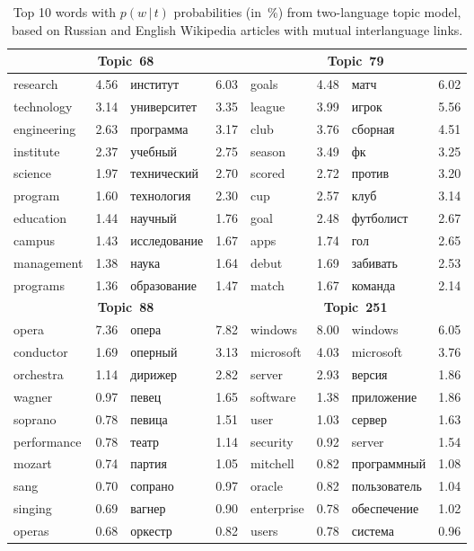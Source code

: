 \documentclass[russian]{llncs}
\newcommand{\cond}{\mspace{3mu}{|}\mspace{3mu}}
\begin{document}
\begin{table}[t!]
	\caption{
        Top 10 words with $p(w\cond t)$ probabilities (in~\%) from two-language topic model,
        based on Russian and English Wikipedia articles with mutual interlanguage links.}
	\label{tab:top10words}
	\centering\tabcolsep=3pt%
	\footnotesize
    \begin{tabular}{|lr|lr||lr|lr|}	
    	\hline
    	\multicolumn{4}{|c||}{\textbf{Topic~68}} & \multicolumn{4}{c|}{\textbf{Topic~79}\rule{0pt}{3ex}} \\
    	\hline
    	research & 4.56 & институт & 6.03 & goals & 4.48 & матч & 6.02 \\
    	technology & 3.14 & университет & 3.35 & league & 3.99 & игрок & 5.56 \\
    	engineering & 2.63 & программа & 3.17 & club & 3.76 &  сборная & 4.51 \\
    	institute & 2.37 & учебный & 2.75 & season & 3.49 & фк & 3.25 \\
    	science & 1.97 & технический & 2.70 & scored & 2.72 & против & 3.20 \\
    	program & 1.60 & технология & 2.30 & cup & 2.57 & клуб & 3.14 \\
    	education & 1.44 & научный & 1.76 & goal & 2.48 & футболист & 2.67 \\
    	campus & 1.43 & исследование & 1.67 & apps & 1.74 & гол & 2.65 \\
    	management & 1.38 & наука & 1.64 & debut & 1.69 & забивать & 2.53 \\
    	programs & 1.36 & образование & 1.47 & match & 1.67 & команда & 2.14 \\
    	\hline
    	\multicolumn{4}{|c||}{\textbf{Topic~88}} &     \multicolumn{4}{c|}{\textbf{Topic~251}\rule{0pt}{3ex}}  \\
    	\hline
        opera & 7.36 & опера & 7.82 & windows & 8.00 & windows & 6.05 \\
    	conductor & 1.69 & оперный & 3.13 & microsoft & 4.03 & microsoft & 3.76 \\
    	orchestra & 1.14 & дирижер & 2.82 & server & 2.93 & версия & 1.86 \\
    	wagner & 0.97 & певец & 1.65 & software & 1.38 & приложение & 1.86 \\
    	soprano & 0.78 & певица & 1.51 & user & 1.03 & сервер & 1.63 \\
    	performance & 0.78 & театр & 1.14 & security & 0.92 & server & 1.54 \\
    	mozart & 0.74 & партия & 1.05 & mitchell & 0.82 & программный & 1.08 \\
    	sang & 0.70 & сопрано & 0.97 & oracle & 0.82 &  пользователь & 1.04 \\
    	singing & 0.69 & вагнер & 0.90 & enterprise & 0.78 & обеспечение & 1.02 \\
    	operas & 0.68 & оркестр & 0.82 & users & 0.78 & система & 0.96 \\
    	\hline
	\end{tabular}
\end{table}
\end{document}
